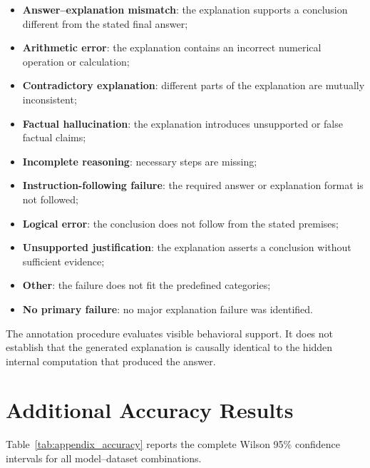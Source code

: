 \documentclass{article}
\begin{document}
\begin{itemize}
    \item \textbf{Answer--explanation mismatch}: the explanation supports
    a conclusion different from the stated final answer;

    \item \textbf{Arithmetic error}: the explanation contains an
    incorrect numerical operation or calculation;

    \item \textbf{Contradictory explanation}: different parts of the
    explanation are mutually inconsistent;

    \item \textbf{Factual hallucination}: the explanation introduces
    unsupported or false factual claims;

    \item \textbf{Incomplete reasoning}: necessary steps are missing;

    \item \textbf{Instruction-following failure}: the required answer or
    explanation format is not followed;

    \item \textbf{Logical error}: the conclusion does not follow from
    the stated premises;

    \item \textbf{Unsupported justification}: the explanation asserts a
    conclusion without sufficient evidence;

    \item \textbf{Other}: the failure does not fit the predefined
    categories;

    \item \textbf{No primary failure}: no major explanation failure was
    identified.
\end{itemize}

The annotation procedure evaluates visible behavioral support. It does
not establish that the generated explanation is causally identical to
the hidden internal computation that produced the answer.

\section{Additional Accuracy Results}
\label{app:accuracy}

Table~\ref{tab:appendix_accuracy} reports the complete Wilson 95\%
confidence intervals for all model--dataset combinations.
\end{document}
